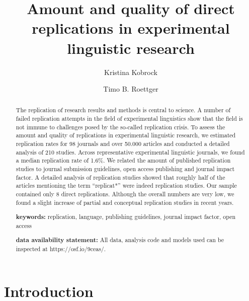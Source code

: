 \documentclass[]{elsarticle} %
\begin{document}
\begin{frontmatter}

  \title{Amount and quality of direct replications in experimental linguistic research}
    \author[University of Osnabrück]{Kristina Kobrock}
    \author[Universitetet i Oslo]{Timo B. Roettger}
      \address[University of Osnabrück]{University of Osnabrück, Institute of Cognitive Science, Wachsbleiche 27, 49090 Osnabrück, Germany}
    \address[Universitetet i Oslo]{Universitetet i Oslo, Department of Linguistics and Scandinavian Studies, Niels Henrik Abels vei 36, 0313 Oslo, Norway}
  
  \begin{abstract}
  The replication of research results and methods is central to science. A number of failed replication attempts in the field of experimental linguistics show that the field is not immune to challenges posed by the so-called replication crisis. To assess the amount and quality of replications in experimental linguistic research, we estimated replication rates for 98 journals and over 50.000 articles and conducted a detailed analysis of 210 studies. Across representative experimental linguistic journals, we found a median replication rate of 1.6\%. We related the amount of published replication studies to journal submission guidelines, open access publishing and journal impact factor. A detailed analysis of replication studies showed that roughly half of the articles mentioning the term ``replicat*'' were indeed replication studies. Our sample contained only 8 direct replications. Although the overall numbers are very low, we found a slight increase of partial and conceptual replication studies in recent years.

  \textbf{keywords:} replication, language, publishing guidelines, journal impact factor, open access

  \textbf{data availability statement:} All data, analysis code and models used can be inspected at https://osf.io/9ceas/.
  \end{abstract}
  
 \end{frontmatter}

\hypertarget{introduction}{%
\section{Introduction}\label{introduction}}
\end{document}

